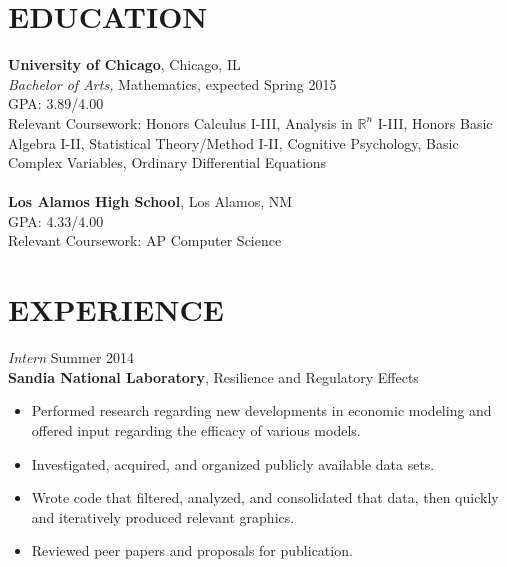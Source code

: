 \documentclass[margin, 10pt]{res} %
\begin{document}
\begin{resume}

% 
%


\section{EDUCATION}

\textbf{University of Chicago}, Chicago, IL \\
{\sl Bachelor of Arts,} Mathematics, expected Spring 2015 \\
GPA: 3.89/4.00 \\
Relevant Coursework: Honors Calculus I-III, Analysis in $\mathbb{R}^n$ I-III, Honors Basic Algebra I-II, Statistical Theory/Method I-II, Cognitive Psychology, Basic Complex Variables, Ordinary Differential Equations \\\\
\textbf{Los Alamos High School}, Los Alamos, NM \\
GPA: 4.33/4.00 \\
Relevant Coursework: AP Computer Science
 
 
\section{EXPERIENCE}

{\sl Intern} \hfill Summer 2014 \\
\textbf{Sandia National Laboratory}, Resilience and Regulatory Effects

\begin{itemize} \itemsep -2pt %
\item Performed research regarding new developments in economic modeling and offered input regarding the efficacy of various models. 
\item Investigated, acquired, and organized publicly available data sets. 
\item Wrote code that filtered, analyzed, and consolidated that data, then quickly and iteratively produced relevant graphics. 
\item Reviewed peer papers and proposals for publication. 
\end{itemize}
 

\end{resume}
\end{document}
